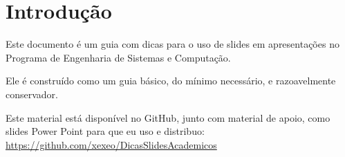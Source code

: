 \section{Introdução}

Este documento é um guia com dicas para o uso de slides em apresentações no Programa de Engenharia de Sistemas e Computação.

Ele é construído como um guia básico, do mínimo necessário, e razoavelmente conservador.

Este material está disponível no GitHub, junto com material de apoio, como slides Power Point para que eu uso e distribuo: \url{https://github.com/xexeo/DicasSlidesAcademicos}

